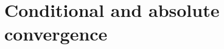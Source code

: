 \documentclass[../book/calcnotes.tex]{subfiles}
\begin{document}
\section{Conditional and absolute convergence}
\label{sec:series-conditional}

\begin{exercises}
\end{exercises}
\end{document}
